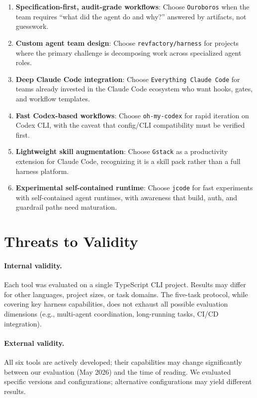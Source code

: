 \documentclass[11pt,a4paper]{article}
\newcommand{\tool}[1]{\texttt{#1}}
\begin{document}
\begin{enumerate}
  \item \textbf{Specification-first, audit-grade workflows}: Choose \tool{Ouroboros} when the team requires ``what did the agent do and why?'' answered by artifacts, not guesswork.
  \item \textbf{Custom agent team design}: Choose \tool{revfactory/harness} for projects where the primary challenge is decomposing work across specialized agent roles.
  \item \textbf{Deep Claude Code integration}: Choose \tool{Everything Claude Code} for teams already invested in the Claude Code ecosystem who want hooks, gates, and workflow templates.
  \item \textbf{Fast Codex-based workflows}: Choose \tool{oh-my-codex} for rapid iteration on Codex CLI, with the caveat that config/CLI compatibility must be verified first.
  \item \textbf{Lightweight skill augmentation}: Choose \tool{Gstack} as a productivity extension for Claude Code, recognizing it is a skill pack rather than a full harness platform.
  \item \textbf{Experimental self-contained runtime}: Choose \tool{jcode} for fast experiments with self-contained agent runtimes, with awareness that build, auth, and guardrail paths need maturation.
\end{enumerate}

\section{Threats to Validity}
\label{sec:threats}

\paragraph{Internal validity.}
Each tool was evaluated on a single TypeScript CLI project.
Results may differ for other languages, project sizes, or task domains.
The five-task protocol, while covering key harness capabilities, does not exhaust all possible evaluation dimensions (e.g., multi-agent coordination, long-running tasks, CI/CD integration).

\paragraph{External validity.}
All six tools are actively developed; their capabilities may change significantly between our evaluation (May 2026) and the time of reading.
We evaluated specific versions and configurations; alternative configurations may yield different results.
\end{document}
